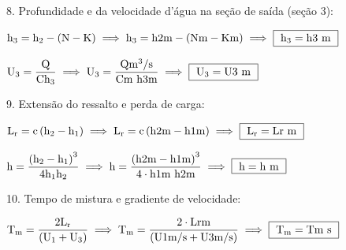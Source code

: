 \documentclass{article}
\newcommand{\myspace}{0.5cm}
\begin{document}
\vspace{\myspace}

8. Profundidade e da velocidade d'água na seção de saída (seção 3):

\vspace{\myspace}

\begin{center}
	$
		\mathrm
		{
			h_{3} = h_{2} - \left ( N - K \right )
		} 
		\implies
		\mathrm
		{
			h_{3} = {{h2}}m - \left ( {{N}}m - {{K}}m \right )
		}
		\implies 
		\fbox
		{
			$\mathrm
			{	
				h_{3} = {{h3}} \ m
			}$
		}
	$  
\end{center}

\vspace{\myspace}

\begin{center}
	$
		\mathrm
		{
			U_{3} = \dfrac{Q}{Ch_{3}}
		} 
		\implies
		\mathrm
		{
			U_{3} = \dfrac{ {{Q}}m^{3}/s }{ {{C}}m \ {{h3}}m }
		}
		\implies 
		\fbox
		{	
			$\mathrm
			{
				U_{3} = {{U3}} \ m
			}$
		}
	$ 
\end{center}

\vspace{\myspace}

9. Extensão do ressalto e perda de carga:

\vspace{\myspace}

\begin{center}
	$
		\mathrm
		{
			L_{r} = c\left ( h_{2} - h_{1} \right)
		} 
		\implies
		\mathrm
		{
			L_{r} = {{c}}\left ( {{h2}}m - {{h1}}m \right)
		}
		\implies 
		\fbox
		{ 
			$\mathrm
			{
				L_{r} = {{Lr}} \ m
			}$
		}
	$
\end{center}

\vspace{\myspace}

\begin{center}
	$
		\mathrm
		{
			h = \dfrac{\left ( h_{2} - h_{1} \right)^{3}}{4h_{1}h_{2}} 
		} 
		\implies
		\mathrm
		{
			h = \dfrac{\left ( {{h2}}m - {{h1}}m \right)^{3} }{4\cdot {{h1}}m \ {{h2}}m } 
		}
		\implies 
		\fbox
		{
			$\mathrm
			{
				h = {{h}} \ m
			}$
		}
	$
\end{center}

\vspace{\myspace}

10. Tempo de mistura e gradiente de velocidade:

\vspace{\myspace}

\begin{center}
	$
		\mathrm
		{
			T_{m} = \dfrac{2L_{r}}{\left ( U_{1} + U_{3} \right)}
		} 
		\implies
		\mathrm
		{
			T_{m} = \dfrac{2\cdot {{Lr}}m }{\left ( {{U1}}m/s + {{U3}}m/s \right)}
		}
		\implies 
		\fbox
		{ 
			$\mathrm
			{
				T_{m}= {{Tm}} \ s
			}$
		}
	$
\end{center}
\end{document}
